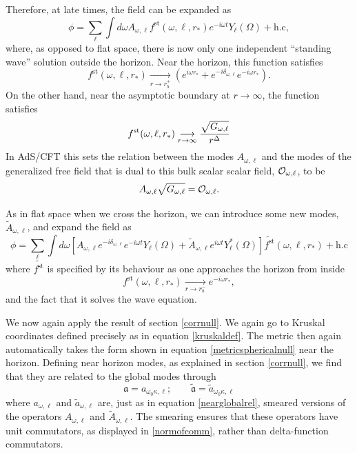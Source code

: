 \documentclass[12pt]{article}
\def\fst{f^{\text{st}}}
\newcommand{\op}{{\cal O}} %
\def\rtor{{r_*}}
\newcommand{\be}{\begin{equation}}
\newcommand{\ee}{\end{equation}}
\def \anh {\mathfrak{a}}
\def \tildanh {\widetilde{\mathfrak{a}}}
\begin{document}
Therefore, at late times, the field can be expanded as 
\be
\label{phiexpandads}
\phi = \sum_{\ell} \int d \omega A_{\omega, \ell} \fst(\omega, \ell, \rtor) e^{-i \omega t} Y_{\ell}(\Omega) + \text{h.c},
\ee
where, as opposed to flat space, there is now only one independent ``standing wave'' solution outside the horizon. Near the horizon, this function satisfies
\be
\fst(\omega, \ell, \rtor)  \underset{r \rightarrow r_h^+}{\longrightarrow}  \left( e^{i \omega \rtor} + e^{-i \delta_{\omega,\ell}} e^{-i \omega \rtor} \right). 
\ee
On the other hand, near the asymptotic boundary at $r \rightarrow \infty$, the function satisfies 
\be
\fst(\omega, \ell, \rtor) \underset{r \rightarrow \infty}{\longrightarrow} {\sqrt{G_{\omega, \ell}} \over r^{\Delta}}
\ee
In AdS/CFT this sets the relation between the modes $A_{\omega, \ell}$ and the modes of the generalized free field that is dual to this bulk scalar scalar field, $\op_{\omega, \ell}$, to be
\be
\label{bulkbdryrelation}
A_{\omega, \ell} \sqrt{G_{\omega, \ell}} = \op_{\omega, \ell}.
\ee

As in flat space when we cross the horizon, we can introduce some new modes, $\widetilde{A}_{\omega, \ell}$, and expand the field as
\be
\label{adsexpandbehindhor}
\phi = \sum_{\ell} \int d \omega \left[A_{\omega, \ell}  e^{-i \delta_{\omega, \ell}} e^{-i \omega t} Y_{\ell}(\Omega)  + \widetilde{A}_{\omega, \ell}  e^{i \omega t} Y_{\ell}^*(\Omega) \right] \widetilde{\fst}(\omega, \ell, \rtor)  + \text{h.c}
\ee
where $\widetilde{\fst}$ is specified by its behaviour as one approaches the horizon from inside
\be
\fst(\omega, \ell, \rtor) \underset{r \rightarrow r_h^-}{\longrightarrow} e^{-i \omega \rtor},
\ee
and the fact that it solves the wave equation.

We now again apply the result of section \ref{corrnull}. We again go to Kruskal coordinates defined precisely as in equation \eqref{kruskaldef}. The metric then again automatically takes the form shown in equation \ref{metricsphericalnull} near the horizon. Defining near horizon modes, as explained in section \ref{corrnull}, we find that they are related to the global modes through
\be
\anh = a_{\omega_0 \kappa, \ell}; \qquad \tildanh = \widetilde{a}_{\omega_0 \kappa, \ell}
\ee
where $a_{\omega, \ell}$ and $\widetilde{a}_{\omega, \ell}$ are, just as in equation \eqref{nearglobalrel},  smeared versions of the operators $A_{\omega, \ell}$ and $\widetilde{A}_{\omega, \ell}$. The smearing ensures that these operators have unit commutators, as displayed in \eqref{normofcomm}, rather than delta-function commutators. 
\end{document}
